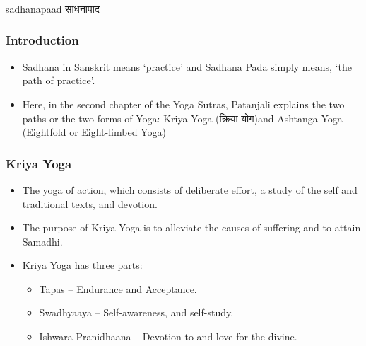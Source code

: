 \begin{frame}[fragile]\frametitle{}
\begin{center}
{\Large sadhanapaad साधनापाद}
\end{center}
\end{frame}


\begin{frame}[fragile]\frametitle{Introduction}


	\begin{itemize}
	\item Sadhana in Sanskrit means `practice' and Sadhana Pada simply means, `the path of practice'. 	
	\item Here, in the second chapter of the Yoga Sutras, Patanjali explains the two paths or the two forms of Yoga: Kriya Yoga (क्रिया योग)and Ashtanga Yoga (Eightfold or Eight-limbed Yoga)
	\end{itemize}

\end{frame}

\begin{frame}[fragile]\frametitle{Kriya Yoga}


	\begin{itemize}
	\item The yoga of action, which consists of deliberate effort, a study of the self and traditional texts, and devotion. 
	\item The purpose of Kriya Yoga is to alleviate the causes of suffering and to attain Samadhi. 
	\item Kriya Yoga has three parts:
		\begin{itemize}
		\item Tapas – Endurance and Acceptance.
		\item Swadhyaaya – Self-awareness, and self-study.
		\item Ishwara Pranidhaana – Devotion to and love for the divine.
		\end{itemize}	
	\end{itemize}

\end{frame}

